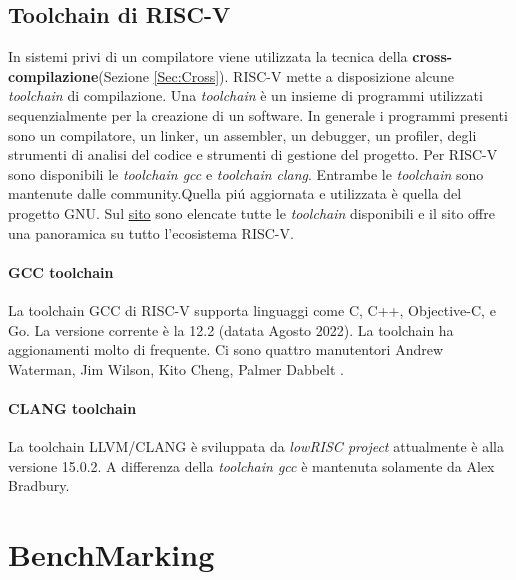 \documentclass[12pt, a4paper]{report}
\begin{document}
\section{Toolchain di RISC-V}
In sistemi privi di un compilatore viene utilizzata la tecnica della \textbf{cross-compilazione}(Sezione \ref{Sec:Cross}). RISC-V mette a disposizione alcune \textit{toolchain} di compilazione. Una \textit{toolchain} è un insieme di programmi utilizzati sequenzialmente per la creazione di un software. In generale i programmi presenti sono un compilatore, un linker, un assembler, un debugger, un profiler, degli strumenti di analisi del codice e strumenti di gestione del progetto. Per RISC-V sono disponibili le \textit{toolchain gcc}\cite{toolchain_gcc} e \textit{toolchain clang}\cite{toolchain_clang}. Entrambe le \textit{toolchain} sono mantenute dalle community.Quella pi\'u aggiornata e utilizzata è quella del progetto GNU. Sul \href{https://wiki.riscv.org/display/HOME/RISC-V+Software+Ecosystem}{sito} sono elencate tutte le \textit{toolchain} disponibili e il sito offre una panoramica su tutto l'ecosistema RISC-V.


\subsubsection{GCC toolchain}
La toolchain GCC di RISC-V supporta linguaggi come C, C++, Objective-C, e Go. La versione corrente è la 12.2 (datata Agosto 2022). La toolchain ha aggionamenti molto di frequente. Ci sono quattro manutentori Andrew Waterman, Jim Wilson, Kito Cheng, Palmer Dabbelt .

\subsubsection{CLANG toolchain}
La toolchain LLVM/CLANG è sviluppata da \textit{lowRISC project} attualmente è alla versione 15.0.2. A differenza della \textit{toolchain gcc} è mantenuta solamente da Alex Bradbury.



\chapter{BenchMarking}
\end{document}
